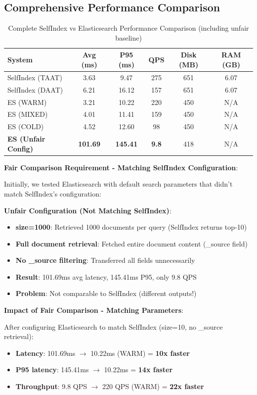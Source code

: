 \documentclass[12pt,a4paper]{article}
\begin{document}
\subsection{Comprehensive Performance Comparison}

\begin{table}[H]
\centering
\begin{tabular}{lccccc}
\toprule
\textbf{System} & \textbf{Avg (ms)} & \textbf{P95 (ms)} & \textbf{QPS} & \textbf{Disk (MB)} & \textbf{RAM (GB)} \\
\midrule
SelfIndex (TAAT) & 3.63 & 9.47 & 275 & 651 & 6.07 \\
SelfIndex (DAAT) & 6.21 & 16.12 & 157 & 651 & 6.07 \\
\midrule
ES (WARM) & 3.21 & 10.22 & 220 & 450 & N/A \\
ES (MIXED) & 4.01 & 11.41 & 159 & 450 & N/A \\
ES (COLD) & 4.52 & 12.60 & 98 & 450 & N/A \\
\midrule
\textbf{ES (Unfair Config)} & \textbf{101.69} & \textbf{145.41} & \textbf{9.8} & 418 & N/A \\
\bottomrule
\end{tabular}
\caption{Complete SelfIndex vs Elasticsearch Performance Comparison (including unfair baseline)}
\end{table}

\textbf{Fair Comparison Requirement - Matching SelfIndex Configuration}:

Initially, we tested Elasticsearch with default search parameters that didn't match SelfIndex's configuration:

\textbf{Unfair Configuration (Not Matching SelfIndex)}:
\begin{itemize}
    \item \textbf{size=1000}: Retrieved 1000 documents per query (SelfIndex returns top-10)
    \item \textbf{Full document retrieval}: Fetched entire document content (\_source field)
    \item \textbf{No \_source filtering}: Transferred all fields unnecessarily
    \item \textbf{Result}: 101.69ms avg latency, 145.41ms P95, only 9.8 QPS
    \item \textbf{Problem}: Not comparable to SelfIndex (different outputs!)
\end{itemize}

\textbf{Impact of Fair Comparison - Matching Parameters}:

After configuring Elasticsearch to match SelfIndex (size=10, no \_source retrieval):
\begin{itemize}
    \item \textbf{Latency}: 101.69ms $\rightarrow$ 10.22ms (WARM) = \textbf{10x faster}
    \item \textbf{P95 latency}: 145.41ms $\rightarrow$ 10.22ms = \textbf{14x faster}
    \item \textbf{Throughput}: 9.8 QPS $\rightarrow$ 220 QPS (WARM) = \textbf{22x faster}
\end{itemize}
\end{document}

